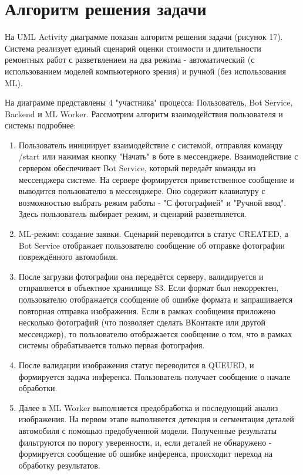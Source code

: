 \chapter{Алгоритм решения задачи}\label{ch:7}

На UML Activity диаграмме показан алгоритм решения задачи (рисунок 17). Система реализует единый сценарий оценки стоимости и длительности ремонтных работ с разветвлением на два режима - автоматический (с использованием моделей компьютерного зрения) и ручной (без использования ML). 

На диаграмме представлены 4 "участника" процесса: Пользователь, Bot Service, Backend и ML Worker. 
Рассмотрим алгоритм взаимодействия пользователя и системы подробнее:

\begin{enumerate}[label=\arabic*.]
    \item Пользователь инициирует взаимодействие с системой, отправляя команду /start или нажимая кнопку "Начать" в боте в мессенджере. Взаимодействие с сервером обеспечивает Bot Service, который передаёт команды из мессенджера системе. На сервере формируется приветственное сообщение и выводится пользователю в мессенджере. Оно содержит клавиатуру с возможностью выбрать режим работы - "С фотографией" и "Ручной ввод". Здесь пользователь выбирает режим, и сценарий разветвляется.
    \item ML-режим: создание заявки. Сценарий переводится в статус CREATED, а Bot Service отображает пользователю сообщение об отправке фотографии повреждённого автомобиля.
    \item После загрузки фотографии она передаётся серверу, валидируется и отправляется в объектное хранилище S3. Если формат был некорректен, пользователю отображается сообщение об ошибке формата и запрашивается повторная отправка изображения. Если в рамках сообщения приложено несколько фотографий (что позволяет сделать ВКонтакте или другой мессенджер), то пользователю отображается сообщение о том, что в рамках системы обрабатывается только первая фотография.
    \item После валидации изображения статус переводится в QUEUED, и формируется задача инференса. Пользователь получает сообщение о начале обработки.
    \item Далее в ML Worker выполняется предобработка и последующий анализ изображения. На первом этапе выполняется детекция и сегментация деталей автомобиля с помощью предобученной модели. Полученные результаты фильтруются по порогу уверенности, и, если деталей не обнаружено - формируется сообщение об ошибке инференса, происходит переход на обработку результатов.

\end{enumerate}
